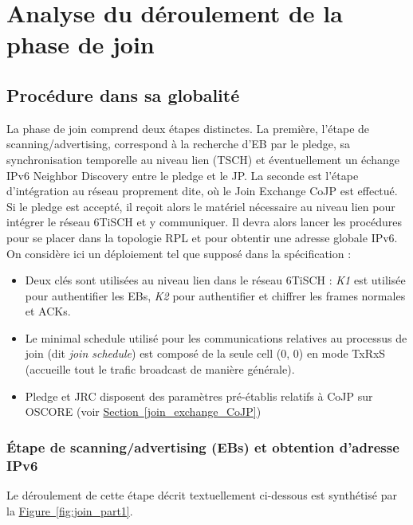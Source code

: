 \documentclass[]{report}
\newcommand{\wordlink}[2]{\hyperref[#2]{#1~\ref{#2}}}
\begin{document}
\newpage

\section{Analyse du déroulement de la phase de join}
\label{join_phase_analysis}

\subsection{Procédure dans sa globalité}
La phase de join comprend deux étapes distinctes. La première, l'étape de scanning/advertising, correspond à la recherche d'EB par le pledge, sa synchronisation temporelle au niveau lien (TSCH) et éventuellement un échange IPv6 Neighbor Discovery entre le pledge et le JP. La seconde est l'étape d'intégration au réseau proprement dite, où le Join Exchange CoJP est effectué. Si le pledge est accepté, il reçoit alors le matériel nécessaire au niveau lien pour intégrer le réseau 6TiSCH et y communiquer. Il devra alors lancer les procédures pour se placer dans la topologie RPL et pour obtentir une adresse globale IPv6.\\

On considère ici un déploiement tel que supposé dans la spécification \cite{rfc8180} : 
\begin{itemize}[label=$\bullet$]
\item Deux clés sont utilisées au niveau lien dans le réseau 6TiSCH : \textit{K1} est utilisée pour authentifier les EBs, \textit{K2} pour authentifier et chiffrer les frames normales et ACKs.
\item Le minimal schedule utilisé pour les communications relatives au processus de join (dit \textit{join schedule}) est composé de la seule cell (0, 0) en mode TxRxS (accueille tout le trafic broadcast de manière générale).
\item Pledge et JRC disposent des paramètres pré-établis relatifs à CoJP sur OSCORE (voir \wordlink{Section}{join_exchange_CoJP})
\end{itemize}

\subsubsection{Étape de scanning/advertising (EBs) et obtention d'adresse IPv6}
\label{global_EB}

Le déroulement de cette étape décrit textuellement ci-dessous est synthétisé par la \wordlink{Figure}{fig:join_part1}.\\
\end{document}
